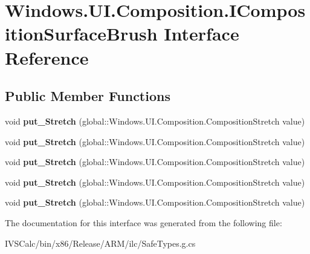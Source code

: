 \hypertarget{interface_windows_1_1_u_i_1_1_composition_1_1_i_composition_surface_brush}{}\section{Windows.\+U\+I.\+Composition.\+I\+Composition\+Surface\+Brush Interface Reference}
\label{interface_windows_1_1_u_i_1_1_composition_1_1_i_composition_surface_brush}
\subsection*{Public Member Functions}
\begin{DoxyCompactItemize}
\item 
\mbox{\label{interface_windows_1_1_u_i_1_1_composition_1_1_i_composition_surface_brush_ae23cdf1be89afa0cdf8bbac1e8f4d8d1}} 
void {\bfseries put\+\_\+\+Stretch} (global\+::\+Windows.\+U\+I.\+Composition.\+Composition\+Stretch value)
\item 
\mbox{\label{interface_windows_1_1_u_i_1_1_composition_1_1_i_composition_surface_brush_ae23cdf1be89afa0cdf8bbac1e8f4d8d1}} 
void {\bfseries put\+\_\+\+Stretch} (global\+::\+Windows.\+U\+I.\+Composition.\+Composition\+Stretch value)
\item 
\mbox{\label{interface_windows_1_1_u_i_1_1_composition_1_1_i_composition_surface_brush_ae23cdf1be89afa0cdf8bbac1e8f4d8d1}} 
void {\bfseries put\+\_\+\+Stretch} (global\+::\+Windows.\+U\+I.\+Composition.\+Composition\+Stretch value)
\item 
\mbox{\label{interface_windows_1_1_u_i_1_1_composition_1_1_i_composition_surface_brush_ae23cdf1be89afa0cdf8bbac1e8f4d8d1}} 
void {\bfseries put\+\_\+\+Stretch} (global\+::\+Windows.\+U\+I.\+Composition.\+Composition\+Stretch value)
\item 
\mbox{\label{interface_windows_1_1_u_i_1_1_composition_1_1_i_composition_surface_brush_ae23cdf1be89afa0cdf8bbac1e8f4d8d1}} 
void {\bfseries put\+\_\+\+Stretch} (global\+::\+Windows.\+U\+I.\+Composition.\+Composition\+Stretch value)
\end{DoxyCompactItemize}


The documentation for this interface was generated from the following file\+:\begin{DoxyCompactItemize}
\item 
I\+V\+S\+Calc/bin/x86/\+Release/\+A\+R\+M/ilc/Safe\+Types.\+g.\+cs\end{DoxyCompactItemize}
